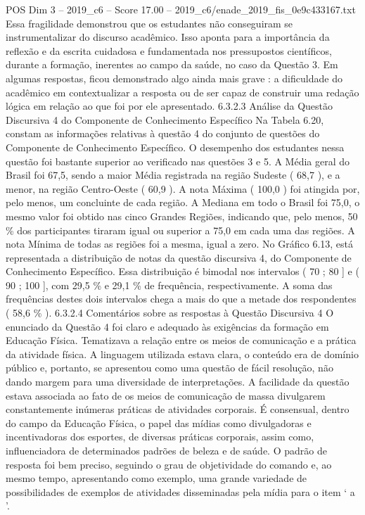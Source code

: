\begin{textsample}{POS Dim 3 – 2019\_c6 – Score 17.00 – 2019\_c6/enade\_2019\_fis\_0e9c433167.txt}
Essa fragilidade demonstrou que os estudantes não conseguiram se instrumentalizar do discurso acadêmico.
Isso aponta para a importância da reflexão e da escrita cuidadosa e fundamentada nos pressupostos científicos, durante a formação, inerentes ao campo da saúde, no caso da Questão 3.
Em algumas respostas, ficou demonstrado algo ainda mais grave : a dificuldade do acadêmico em contextualizar a resposta ou de ser capaz de construir uma redação lógica em relação ao que foi por ele apresentado. 6.3.2.3 Análise da Questão Discursiva 4 do Componente de Conhecimento Específico Na Tabela 6.20, constam as informações relativas à questão 4 do conjunto de questões do Componente de Conhecimento Específico.
O desempenho dos estudantes nessa questão foi bastante superior ao verificado nas questões 3 e 5.
A Média geral do Brasil foi 67,5, sendo a maior Média registrada na região Sudeste ( 68,7 ), e a menor, na região Centro-Oeste ( 60,9 ).
A nota Máxima ( 100,0 ) foi atingida por, pelo menos, um concluinte de cada região.
A Mediana em todo o Brasil foi 75,0, o mesmo valor foi obtido nas cinco Grandes Regiões, indicando que, pelo menos, 50 \% dos participantes tiraram igual ou superior a 75,0 em cada uma das regiões.
A nota Mínima de todas as regiões foi a mesma, igual a zero.
No Gráfico 6.13, está representada a distribuição de notas da questão discursiva 4, do Componente de Conhecimento Específico.
Essa distribuição é bimodal nos intervalos ( 70 ; 80 ] e ( 90 ; 100 ], com 29,5 \% e 29,1 \% de frequência, respectivamente.
A soma das frequências destes dois intervalos chega a mais do que a metade dos respondentes ( 58,6 \% ). 6.3.2.4 Comentários sobre as respostas à Questão Discursiva 4 O enunciado da Questão 4 foi claro e adequado às exigências da formação em Educação Física.
Tematizava a relação entre os meios de comunicação e a prática da atividade física.
A linguagem utilizada estava clara, o conteúdo era de domínio público e, portanto, se apresentou como uma questão de fácil resolução, não dando margem para uma diversidade de interpretações.
A facilidade da questão estava associada ao fato de os meios de comunicação de massa divulgarem constantemente inúmeras práticas de atividades corporais.
É consensual, dentro do campo da Educação Física, o papel das mídias como divulgadoras e incentivadoras dos esportes, de diversas práticas corporais, assim como, influenciadora de determinados padrões de beleza e de saúde.
O padrão de resposta foi bem preciso, seguindo o grau de objetividade do comando e, ao mesmo tempo, apresentando como exemplo, uma grande variedade de possibilidades de exemplos de atividades disseminadas pela mídia para o item ‘ a ’.

\end{textsample}
